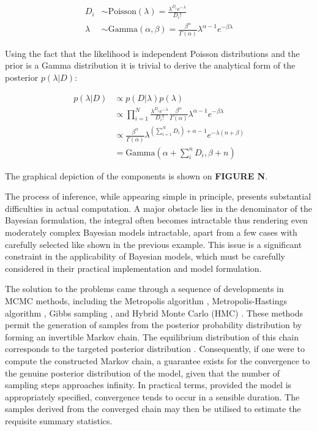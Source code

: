 \begin{align}
    D_i & \sim \text{Poisson}(\lambda) = \frac{\lambda^{D_i} e^{-\lambda}}{D_i!} \\
    \lambda & \sim \text{Gamma}(\alpha, \beta) = \frac{\beta^\alpha}{\Gamma(\alpha)} \lambda^{\alpha - 1} e^{-\beta \lambda}
\end{align}
    
Using the fact that the likelihood is independent Poisson distributions and the prior is a Gamma distribution it is trivial to derive the analytical form of the posterior $p(\lambda|D)$:

\begin{align}
        p(\lambda|D) & \propto p(D|\lambda) p(\lambda) \\
         & \propto \prod_{i=1}^N \frac{\lambda^{D_i} e^{-\lambda}}{D_i!} \frac{\beta^\alpha}{\Gamma(\alpha)} \lambda^{\alpha - 1} e^{-\beta \lambda} \\ 
        & \propto  \frac{\beta^\alpha}{\Gamma(\alpha)} \lambda^{\left(\sum_{i=1}^N D_i\right) + \alpha - 1} e^{-\lambda(n+\beta)} \\
         & = \text{Gamma}(\alpha + \sum_i^n D_i, \beta + n)
\end{align}

The graphical depiction of the components is shown on \textbf{FIGURE N}.


The process of inference, while appearing simple in principle, presents substantial difficulties in actual computation. A major obstacle lies in the denominator of the Bayesian formulation, the integral often becomes intractable  thus rendering even moderately complex Bayesian models intractable, apart from a few cases with carefully selected  like shown in the previous example. This issue is a significant constraint in the applicability of Bayesian models, which must be carefully considered in their practical implementation and model formulation.

The solution to the problems came through a sequence of developments in \ac{MCMC} methods, including the Metropolis algorithm \citep{Rosenbluth1953-gu}, Metropolis-Hastings algorithm \citep{Hastings1970-mb}, Gibbs sampling \citep{Geman1984-nk}, and Hybrid Monte Carlo (HMC) \citep{Duane1987-gu}. These methods permit the generation of samples from the posterior probability distribution by forming an invertible Markov chain. The equilibrium distribution of this chain corresponds to the targeted posterior distribution \citep{Roberts2004-op}. Consequently, if one were to compute the constructed Markov chain, a guarantee exists for the convergence to the genuine posterior distribution of the model, given that the number of sampling steps approaches infinity. In practical terms, provided the model is appropriately specified, convergence tends to occur in a sensible duration. The samples derived from the converged chain may then be utilised to estimate the requisite summary statistics. 

